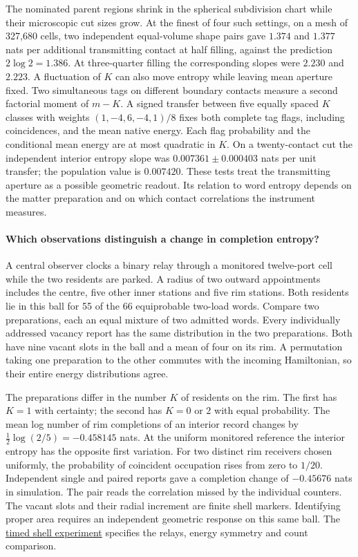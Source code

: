 \documentclass[11pt]{article}
\begin{document}
The nominated parent regions shrink in the spherical subdivision chart
while their microscopic cut sizes grow. At the finest of four such
settings, on a mesh of 327,680 cells, two independent equal-volume shape
pairs gave $1.374$ and $1.377$ nats per additional transmitting contact at
half filling, against the prediction $2\log 2=1.386$. At three-quarter
filling the corresponding slopes were $2.230$ and $2.223$. A fluctuation
of $K$ can also move entropy while leaving mean aperture fixed. Two
simultaneous tags on different boundary contacts measure a second
factorial moment of $m-K$. A signed transfer between five equally spaced
$K$ classes with weights $(1,-4,6,-4,1)/8$ fixes both complete tag
flags, including coincidences, and the mean native energy. Each flag
probability and the conditional mean energy are at most quadratic in
$K$. On a twenty-contact cut the independent interior entropy slope was
$0.007361\pm0.000403$ nats per unit transfer; the population value is
$0.007420$. These tests treat the transmitting aperture as a possible
geometric readout. Its relation to word entropy depends on the matter
preparation and on which contact correlations the instrument measures.

\paragraph{Which observations distinguish a change in completion entropy?}
A central observer clocks a binary relay through a monitored twelve-port
cell while the two residents are parked. A radius of two outward
appointments includes the centre, five other inner stations and five
rim stations. Both residents lie in this ball for 55 of the 66
equiprobable two-load words. Compare two preparations, each an equal
mixture of two admitted words. Every individually addressed vacancy
report has the same distribution in the two preparations. Both have
nine vacant slots in the ball and a mean of four on its rim. A
permutation taking one preparation to the other commutes with the
incoming Hamiltonian, so their entire energy distributions agree.

The preparations differ in the number $K$ of residents on the rim.
The first has $K=1$ with certainty; the second has $K=0$ or $2$ with
equal probability. The mean log number of rim completions of an
interior record changes by
$\tfrac12\log(2/5)=-0.458145$ nats. At the uniform monitored reference
the interior entropy has the opposite first variation. For two distinct
rim receivers chosen uniformly, the probability of coincident occupation
rises from zero to $1/20$. Independent single and paired reports gave
a completion change of $-0.45676$ nats in simulation. The pair reads the
correlation missed by the individual counters. The vacant slots and
their radial increment are finite shell markers. Identifying proper
area requires an independent geometric response on this same ball.
The \href{https://github.com/FloatingPragma/observer-patch-holography/blob/main/model/experiments/interval_echo_einstein_station/equilibrium_refinement/CLOCK_BALL.md}{timed shell experiment}
specifies the relays, energy symmetry and count comparison.
\end{document}
